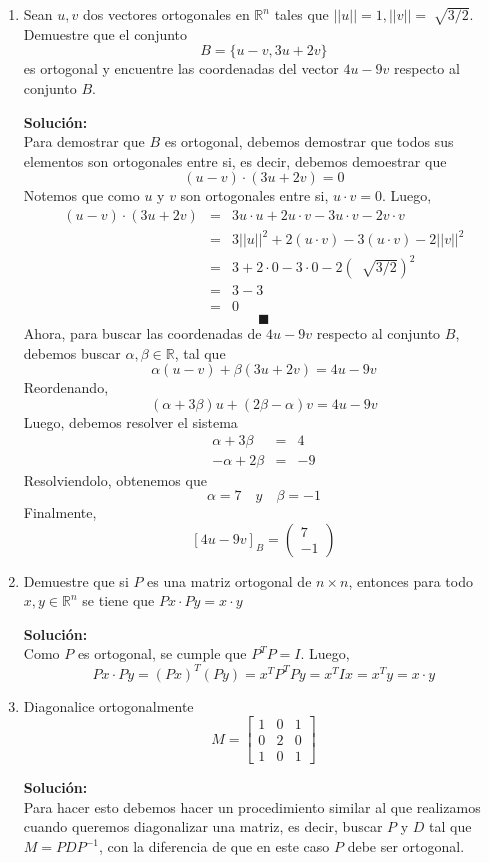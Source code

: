 \documentclass[12pt]{article}
\newenvironment{solucion}
{\begin{mdframed}[backgroundcolor=black!10]
		{\bf Solución:}\\
	}
	{
	\end{mdframed}
}
\newenvironment{preguntas}
{\begin{enumerate}\itemsep12pt
	}
	{
	\end{enumerate}
}
\newcommand{\R}{\mathbb{R}}
\begin{document}
\begin{preguntas}
\item Sean $u, v$ dos vectores ortogonales en $\R^n$ tales que $||u|| = 1, ||v|| = \sqrt[]{3/2}$. Demuestre que el conjunto 
	$$B = \{u-v, 3u+2v\}$$
	es ortogonal y encuentre las coordenadas del vector $4u - 9v$ respecto al conjunto $B$.
\begin{solucion}
Para demostrar que $B$ es ortogonal, debemos demostrar que todos sus elementos son ortogonales entre si, es decir, debemos demoestrar que
		$$(u-v) \cdot (3u+2v) = 0$$
		Notemos que como $u$ y $v$ son ortogonales entre si, $u \cdot v = 0$. Luego,
		$$\begin{array}{rcl}
		(u-v) \cdot (3u+2v) & = & 3u \cdot u + 2 u \cdot v - 3u \cdot v - 2v \cdot v\\
		& = & 3||u||^2 + 2 (u \cdot v) - 3(u \cdot v) - 2||v||^2 \\
		& = & 3 + 2 \cdot 0 - 3 \cdot 0 - 2(\ \sqrt[]{3/2})^2 \\
		& = & 3 - 3 \\
		& = & 0
		\end{array}$$
		$$\blacksquare$$
		Ahora, para buscar las coordenadas de $4u - 9v$ respecto al conjunto $B$, debemos buscar $\alpha, \beta \in \R$, tal que
		$$\alpha(u-v) + \beta(3u+2v) = 4u-9v$$
		Reordenando,
		$$(\alpha+3\beta)u + (2\beta -\alpha)v= 4u -9v$$
		Luego, debemos resolver el sistema
		$$\begin{array}{rcl}
		\alpha+3\beta & = & 4\\
		-\alpha+2\beta & = & -9
		\end{array}$$
		Resolviendolo, obtenemos que
		$$\alpha = 7 \quad y \quad \beta = -1$$
		Finalmente,
		$$[4u-9v]_B = \begin{pmatrix}
		7 \\ -1
		\end{pmatrix}$$
\end{solucion}
\item Demuestre que si $P$ es una matriz ortogonal de  $n \times n$, entonces para todo $x, y \in \R^n$ se tiene que $Px \cdot Py = x \cdot y$
\begin{solucion}
Como $P$ es ortogonal, se cumple que $P^TP = I$. Luego,
		$$Px \cdot Py = (Px)^T(Py) = x^TP^TPy = x^TIx= x^Ty = x \cdot y$$
\end{solucion}
\item Diagonalice ortogonalmente
	$$M = \begin{bmatrix}
	1 & 0 & 1 \\
	0 & 2 & 0 \\
	1 & 0 & 1
	\end{bmatrix}$$
\begin{solucion}
Para hacer esto debemos hacer un procedimiento similar al que realizamos cuando queremos diagonalizar una matriz, es decir, buscar $P$ y $D$ tal que $M = PDP^{-1}$, con la diferencia de que en este caso $P$ debe ser ortogonal.
		

\end{solucion}
\end{preguntas}
\end{document}
